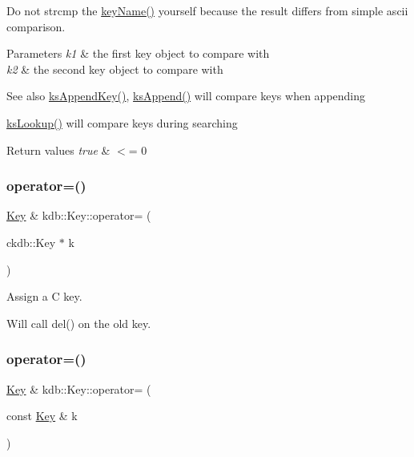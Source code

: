 Do not strcmp the \mbox{\hyperlink{group__keyname_ga8e805c726a60da921d3736cda7813513}{key\+Name()}} yourself because the result differs from simple ascii comparison.


\begin{DoxyParams}{Parameters}
{\em k1} & the first key object to compare with \\
\hline
{\em k2} & the second key object to compare with\\
\hline
\end{DoxyParams}
\begin{DoxySeeAlso}{See also}
\mbox{\hyperlink{group__keyset_gaa5a1d467a4d71041edce68ea7748ce45}{ks\+Append\+Key()}}, \mbox{\hyperlink{group__keyset_ga21eb9c3a14a604ee3a8bdc779232e7b7}{ks\+Append()}} will compare keys when appending 

\mbox{\hyperlink{group__keyset_gaa34fc43a081e6b01e4120daa6c112004}{ks\+Lookup()}} will compare keys during searching
\end{DoxySeeAlso}

\begin{DoxyRetVals}{Return values}
{\em true} & $<$= 0 \\
\hline
\end{DoxyRetVals}
\mbox{\label{classkdb_1_1Key_a628f3ee543a1d71d4488233018eddd86}} 
\subsubsection{\texorpdfstring{operator=()}{operator=()}\hspace{0.1cm}{\footnotesize\ttfamily [1/2]}}
{\footnotesize\ttfamily \mbox{\hyperlink{classkdb_1_1Key}{Key}} \& kdb\+::\+Key\+::operator= (\begin{DoxyParamCaption}\item[{ckdb\+::\+Key $\ast$}]{k }\end{DoxyParamCaption})\hspace{0.3cm}{\ttfamily [inline]}}



Assign a C key. 

Will call del() on the old key. \mbox{\label{classkdb_1_1Key_a63a006c140cfd2a633c6fdf3f9eb9d1a}} 
\subsubsection{\texorpdfstring{operator=()}{operator=()}\hspace{0.1cm}{\footnotesize\ttfamily [2/2]}}
{\footnotesize\ttfamily \mbox{\hyperlink{classkdb_1_1Key}{Key}} \& kdb\+::\+Key\+::operator= (\begin{DoxyParamCaption}\item[{const \mbox{\hyperlink{classkdb_1_1Key}{Key}} \&}]{k }\end{DoxyParamCaption})\hspace{0.3cm}{\ttfamily [inline]}}



